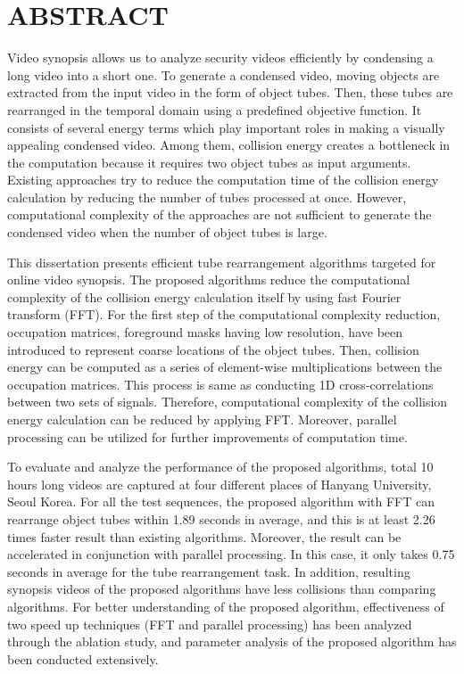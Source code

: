 \documentclass[11pt]{hyu_thesis}
\begin{document}
\restoregeometry
\frontmatter

\tableofcontents
\newpage
\listoffigures
\newpage
\listoftables
\newpage

\mainmatter

\chapter*{ABSTRACT}

Video synopsis allows us to analyze security videos efficiently by condensing a long video into a short one. To generate a condensed video, moving objects are extracted from the input video in the form of object tubes. Then, these tubes are rearranged in the temporal domain using a predefined objective function. It consists of several energy terms which play important roles in making a visually appealing condensed video. Among them, collision energy creates a bottleneck in the computation because it requires two object tubes as input arguments. Existing approaches try to reduce the computation time of the collision energy calculation by reducing the number of tubes processed at once. However, computational complexity of the approaches are not sufficient to generate the condensed video when the number of object tubes is large.

This dissertation presents efficient tube rearrangement algorithms targeted for online video synopsis. The proposed algorithms reduce the computational complexity of the collision energy calculation itself by using fast Fourier transform (FFT). For the first step of the computational complexity reduction, occupation matrices, foreground masks having low resolution, have been introduced to represent coarse locations of the object tubes. Then, collision energy can be computed as a series of element-wise multiplications between the occupation matrices. This process is same as conducting 1D cross-correlations between two sets of signals. Therefore, computational complexity of the collision energy calculation can be reduced by applying FFT. Moreover, parallel processing can be utilized for further improvements of computation time.

To evaluate and analyze the performance of the proposed algorithms, total 10 hours long videos are captured at four different places of Hanyang University, Seoul Korea. For all the test sequences, the proposed algorithm with FFT can rearrange object tubes within 1.89 seconds in average, and this is at least 2.26 times faster result than existing algorithms. Moreover, the result can be accelerated in conjunction with parallel processing. In this case, it only takes 0.75 seconds in average for the tube rearrangement task. In addition, resulting synopsis videos of the proposed algorithms have less collisions than comparing algorithms. For better understanding of the proposed algorithm, effectiveness of two speed up techniques (FFT and parallel processing) has been analyzed through the ablation study, and parameter analysis of the proposed algorithm has been conducted extensively.
\newpage
\end{document}
